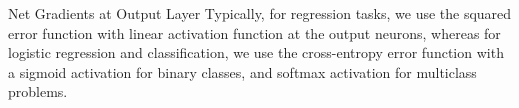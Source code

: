 \begin{frame}{Net Gradients at Output Layer}
%
Typically, for regression tasks, we use the squared error function with
linear activation function at the output neurons, whereas for 
logistic regression and classification, we use the cross-entropy error
function with a sigmoid activation for binary classes, and softmax
activation for multiclass problems. %
\end{frame}
%
